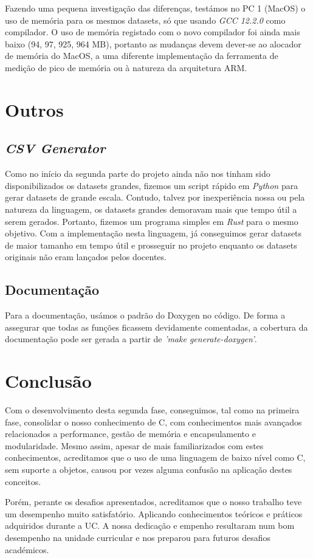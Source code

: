 \documentclass{article}
\begin{document}
            Fazendo uma pequena investigação das diferenças, testámos no PC 1 (MacOS) o uso
            de memória para os mesmos datasets, só que usando \textit{GCC 12.2.0} como compilador.
            O uso de memória registado com o novo compilador foi ainda mais baixo (94, 97, 925, 964 MB), portanto as
            mudanças devem dever-se ao alocador de memória do MacOS, a uma diferente
            implementação da ferramenta de medição de pico de memória ou à natureza da arquitetura ARM.

        \pagebreak
        \section{Outros}
            \subsection{\emph{CSV Generator}}            
                Como no início da segunda parte do projeto ainda não nos tinham sido disponibilizados os datasets grandes,
                fizemos um script rápido em \textit{Python} para gerar datasets de grande escala. Contudo, talvez
                por inexperiência nossa ou pela natureza da linguagem, os datasets grandes demoravam mais que tempo útil 
                a serem gerados. Portanto, fizemos um programa simples em \textit{Rust} para o mesmo objetivo.
                Com a implementação nesta linguagem, já conseguimos gerar datasets de maior tamanho 
                em tempo útil e prosseguir no projeto enquanto os datasets originais não eram lançados pelos docentes.
            \subsection{Documentação}
                Para a documentação, usámos o padrão do Doxygen no código.
                De forma a assegurar que todas as funções ficassem devidamente comentadas,
                a cobertura da documentação pode ser gerada a partir de \textit{'make generate-doxygen'}.
        
        \section{Conclusão}
        Com o desenvolvimento desta segunda fase, conseguimos, tal como na primeira fase, consolidar
        o nosso conhecimento de C, com conhecimentos mais avançados relacionados a performance, gestão
        de memória e encapsulamento e modularidade. Mesmo assim, apesar de mais familiarizados com estes
        conhecimentos, acreditamos que o uso de uma linguagem de baixo nível como C, sem suporte a objetos,
        causou por vezes alguma confusão na aplicação destes conceitos.

        Porém, perante os desafios apresentados, acreditamos que o nosso trabalho teve um desempenho muito
        satisfatório. Aplicando conhecimentos teóricos e práticos adquiridos durante a UC. A nossa dedicação e empenho
        resultaram num bom desempenho na unidade curricular e nos preparou para futuros desafios académicos.
        
\end{document}
